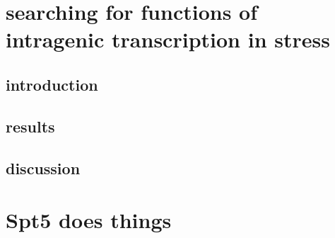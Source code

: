 \documentclass[11pt, letterpaper]{article}
\begin{document}
\section{searching for functions of intragenic transcription in stress}
\subsection{introduction}
\subsection{results}
\subsection{discussion}

\section{Spt5 does things}

{}

\end{document}
